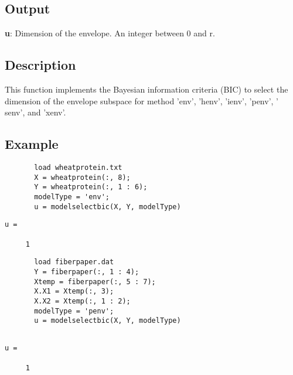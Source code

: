 \documentclass[a4paper,11pt,openany]{memoir}
\begin{document}
\subsection*{Output}

\begin{par}
\textbf{u}: Dimension of the envelope. An integer between 0 and r.
\end{par} \vspace{1em}


\subsection*{Description}

\begin{par}
This function implements the Bayesian information criteria (BIC) to select the dimension of the envelope subspace for method 'env', 'henv', 'ienv', 'penv', ' senv', and 'xenv'.
\end{par} \vspace{1em}


\subsection*{Example}


\begin{verbatim}       load wheatprotein.txt
       X = wheatprotein(:, 8);
       Y = wheatprotein(:, 1 : 6);
       modelType = 'env';
       u = modelselectbic(X, Y, modelType)\end{verbatim}
        \color{lightgray}\ttfamily \begin{verbatim}
u =

     1

\end{verbatim} \rmfamily
\color{black}    
\begin{verbatim}       load fiberpaper.dat
       Y = fiberpaper(:, 1 : 4);
       Xtemp = fiberpaper(:, 5 : 7);
       X.X1 = Xtemp(:, 3);
       X.X2 = Xtemp(:, 1 : 2);
       modelType = 'penv';
       u = modelselectbic(X, Y, modelType)\end{verbatim}
    

   \color{lightgray}\ttfamily \begin{verbatim}

u =

     1

\end{verbatim} \rmfamily
\color{black}
    

\newpage
\end{document}
